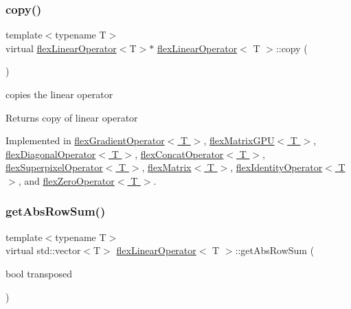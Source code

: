 \subsubsection{\texorpdfstring{copy()}{copy()}}
{\footnotesize\ttfamily template$<$typename T$>$ \\
virtual \hyperlink{classflex_linear_operator}{flex\+Linear\+Operator}$<$T$>$$\ast$ \hyperlink{classflex_linear_operator}{flex\+Linear\+Operator}$<$ T $>$\+::copy (\begin{DoxyParamCaption}{ }\end{DoxyParamCaption})\hspace{0.3cm}{\ttfamily [pure virtual]}}



copies the linear operator 

\begin{DoxyReturn}{Returns}
copy of linear operator 
\end{DoxyReturn}


Implemented in \hyperlink{classflex_gradient_operator_a4b1480051ac7763da809c509685316d2}{flex\+Gradient\+Operator$<$ T $>$}, \hyperlink{classflex_matrix_g_p_u_a4df27ef284eec123ba72f1b5788f1180}{flex\+Matrix\+G\+P\+U$<$ T $>$}, \hyperlink{classflex_diagonal_operator_aeca7325de5eaface63363e9710034128}{flex\+Diagonal\+Operator$<$ T $>$}, \hyperlink{classflex_concat_operator_a8e554cb6edb47de0cf922cf51ec398b5}{flex\+Concat\+Operator$<$ T $>$}, \hyperlink{classflex_superpixel_operator_ab0e066735127a3b39958c6719fe03156}{flex\+Superpixel\+Operator$<$ T $>$}, \hyperlink{classflex_matrix_a4e9d53b8d606511759decbf52628203a}{flex\+Matrix$<$ T $>$}, \hyperlink{classflex_identity_operator_abbd34b97e3e014f02629a68a02f5c41b}{flex\+Identity\+Operator$<$ T $>$}, and \hyperlink{classflex_zero_operator_ab26ce548041980be572f7972907397af}{flex\+Zero\+Operator$<$ T $>$}.

\mbox{\label{classflex_linear_operator_ad6caa7b09e6e3c401cadef61b8e2307e}} 
\subsubsection{\texorpdfstring{get\+Abs\+Row\+Sum()}{getAbsRowSum()}}
{\footnotesize\ttfamily template$<$typename T$>$ \\
virtual std\+::vector$<$T$>$ \hyperlink{classflex_linear_operator}{flex\+Linear\+Operator}$<$ T $>$\+::get\+Abs\+Row\+Sum (\begin{DoxyParamCaption}\item[{bool}]{transposed }\end{DoxyParamCaption})\hspace{0.3cm}{\ttfamily [pure virtual]}}



